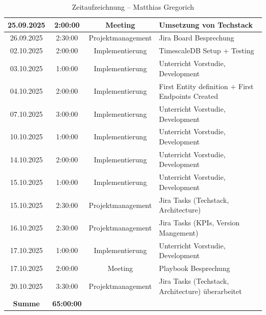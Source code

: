 \documentclass{article}
\begin{document}
\begin{table}[H]
\begin{tabularx}{\textwidth}{|c|c|c|X|}
    25.09.2025 & 2:00:00 & Meeting           & Umsetzung von Techstack \\ \hline
    26.09.2025 & 2:30:00 & Projektmanagement & Jira Board Besprechung \\ \hline
    02.10.2025 & 2:00:00 & Implementierung   & TimescaleDB Setup + Testing \\ \hline
    03.10.2025 & 1:00:00 & Implementierung   & Unterricht Vorstudie, Development \\ \hline
    04.10.2025 & 2:00:00 & Implementierung   & First Entity definition + First Endpoints Created \\ \hline
    07.10.2025 & 3:00:00 & Implementierung   & Unterricht Vorstudie, Development \\ \hline
    10.10.2025 & 1:00:00 & Implementierung   & Unterricht Vorstudie, Development \\ \hline
    14.10.2025 & 2:00:00 & Implementierung   & Unterricht Vorstudie, Development \\ \hline
    15.10.2025 & 1:00:00 & Implementierung   & Unterricht Vorstudie, Development \\ \hline
    15.10.2025 & 2:30:00 & Projektmanagement & Jira Tasks (Techstack, Architecture) \\ \hline
    16.10.2025 & 2:30:00 & Projektmanagement & Jira Tasks (KPIs, Version Mangement) \\ \hline
    17.10.2025 & 1:00:00 & Implementierung   & Unterricht Vorstudie, Development \\ \hline
    17.10.2025 & 2:00:00 & Meeting           & Playbook Besprechung \\ \hline
    20.10.2025 & 3:30:00 & Projektmanagement & Jira Tasks (Techstack, Architecture) überarbeitet \\ \hline
    \rowcolor{black!10}\textbf{Summe} & \textbf{65:00:00} & & \\ \hline
  \end{tabularx}
  \caption{Zeitaufzeichnung – Matthias Gregorich}
  \label{tab:zeit-matthias}
\end{table}
\end{document}
